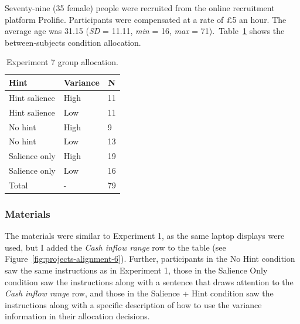 \documentclass[a4paper, nobind, dvipsnames]{templates/ociamthesis}
\theoremstyle{definition}
\theoremstyle{definition}
\theoremstyle{definition}
\theoremstyle{definition}
\theoremstyle{remark}
\begin{document}
Seventy-nine (35 female) people were recruited from the online recruitment platform Prolific. Participants were compensated at a rate of £5 an hour. The average age was 31.15 (\emph{SD} = 11.11, \emph{min} = 16, \emph{max} = 71).~Table~\ref{tab:condition-allocation-alignment-6}
shows the between-subjects condition allocation.

\begin{table}[tbp]

\begin{center}
\begin{threeparttable}

\caption{\label{tab:condition-allocation-alignment-6}Experiment 7 group allocation.}

\begin{tabular}{lll}
\toprule
Hint & \multicolumn{1}{c}{Variance} & \multicolumn{1}{c}{N}\\
\midrule
Hint salience & High & 11\\
Hint salience & Low & 11\\
No hint & High & 9\\
No hint & Low & 13\\
Salience only & High & 19\\
Salience only & Low & 16\\
Total & - & 79\\
\bottomrule
\end{tabular}

\end{threeparttable}
\end{center}

\end{table}

\hypertarget{materials-15}{%
\subsubsection{Materials}\label{materials-15}}

The materials were similar to Experiment 1, as the same laptop displays were
used, but I added the \emph{Cash inflow range} row to the table (see
Figure~\ref{fig:projects-alignment-6}). Further, participants in the No Hint
condition saw the same instructions as in Experiment 1, those in the Salience
Only condition saw the instructions along with a sentence that draws attention
to the \emph{Cash inflow range} row, and those in the Salience + Hint condition saw
the instructions along with a specific description of how to use the variance
information in their allocation decisions.
\end{document}
